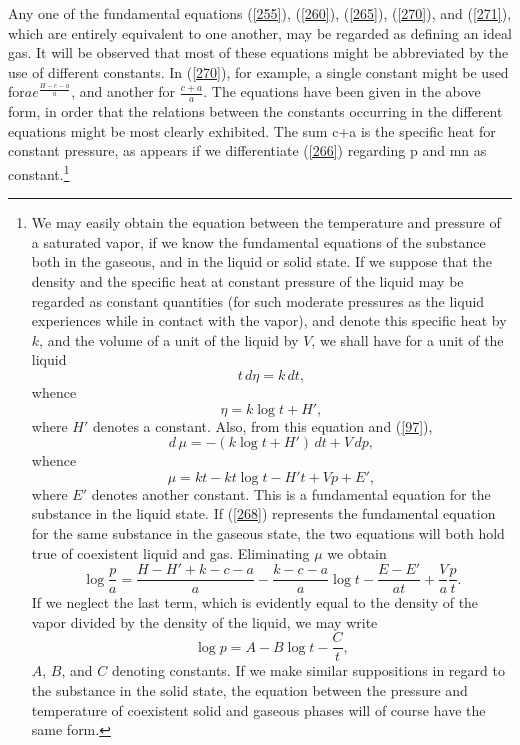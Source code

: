 \documentclass[12pt]{article}
\begin{document}
Any one of the fundamental equations (\ref{255}), (\ref{260}), (\ref{265}), (\ref{270}), and (\ref{271}), which are entirely equivalent to one another, may be regarded as defining an ideal gas. It will be observed that most of these equations might be abbreviated by the use of different constants. In (\ref{270}), for example, a single constant might be used for$a e^{\frac{H-c-a}{a}}$, and another for $\frac{c+a}{a}$. The equations have been given in the above form, in order that the relations between the constants occurring in the different equations might be most clearly exhibited. The sum c+a is the specific heat for constant pressure, as appears if we differentiate (\ref{266}) regarding p and mn as constant.\footnote{We may easily obtain the equation between the temperature and pressure of a saturated vapor, if we know the fundamental equations of the substance both in the gaseous, and in the liquid or solid state. If we suppose that the density and the specific heat at constant pressure of the liquid may be regarded as constant quantities (for such moderate pressures as the liquid experiences while in contact with the vapor), and denote this specific heat by $k$, and the volume of a unit of the liquid by $V$, we shall have for a unit of the liquid
$$t \,d\eta=k\,dt,$$
whence%
$$\eta= k \log t + H',$$%
where $H'$ denotes a constant. Also, from this equation and (\ref{97}),
$$ d\, \mu = -(k \log t + H')\,dt+ V\,dp,$$
whence %
$$\mu= kt- kt \log t - H't + Vp + E', $$%
where $E'$ denotes another constant. This is a fundamental equation for the substance in the liquid state. If (\ref{268}) represents the fundamental equation for the same substance in the gaseous state, the two equations will both hold true of coexistent liquid and gas. Eliminating $\mu$ we obtain
$$ \log \frac{p}{a}=\frac{H-H'+k -c-a}{a} -\frac{k-c-a}{a}\log t - \frac{E - E'}{at} + \frac{V}{a} \frac{p}{t}. $$
If we neglect the last term, which is evidently equal to the density of the vapor divided by the density of the liquid, we may write
$$\log p= A - B \log t- \frac{C}{t},$$
$A$, $B$, and $C$ denoting constants. If we make similar suppositions in regard to the substance in the solid state, the equation between the pressure and temperature of coexistent solid and gaseous phases will of course have the same form.
}
\end{document}
